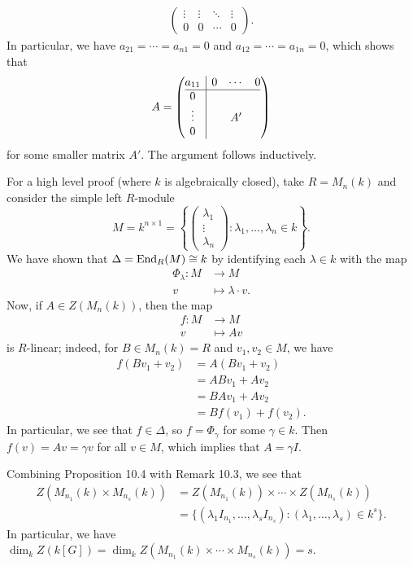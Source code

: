 \begin{pf}
\begin{align*}
\begin{pmatrix}
            \vdots & \vdots & \ddots & \vdots \\
            0 & 0 & \cdots & 0
        \end{pmatrix}. 
    \end{align*}
    In particular, we have $a_{21} = \cdots = a_{n1} = 0$ and 
    $a_{12} = \cdots = a_{1n} = 0$, which shows that 
    \[ A = \left(\begin{array}{@{}c|ccc@{}}
        a_{11} & 0 & \cdots & 0 \\\hline
        0 \\
        \vdots & & A' & \\
        0 
      \end{array}\right) \]
    for some smaller matrix $A'$. The argument follows inductively. 

    For a high level proof (where $k$ is algebraically closed), take 
    $R = M_n(k)$ and consider the simple left $R$-module
    \[ M = k^{n\times 1} = \left\{ \begin{pmatrix} \lambda_1 \\ \vdots \\ 
        \lambda_n \end{pmatrix} : \lambda_1, \dots, \lambda_n \in k \right\}. \] 
    We have shown that $\Delta = \operatorname{End}_R(M) \cong k$
    by identifying each $\lambda \in k$ with the map 
    \begin{align*}
        \Phi_\lambda : M &\to M \\ v &\mapsto \lambda \cdot v. 
    \end{align*} 
    Now, if $A \in Z(M_n(k))$, then the map 
    \begin{align*} f : M &\to M \\ v &\mapsto Av \end{align*}
    is $R$-linear; indeed, for $B \in M_n(k) = R$ and $v_1, v_2 \in M$, we have 
    \begin{align*} 
        f(Bv_1 + v_2) &= A(Bv_1 + v_2) \\ 
        &= ABv_1 + Av_2 \\
        &= BAv_1 + Av_2 \\ 
        &= Bf(v_1) + f(v_2).
    \end{align*}
    In particular, we see that $f \in \Delta$, so $f = \Phi_\gamma$ for some 
    $\gamma \in k$. Then $f(v) = Av = \gamma v$ for all $v \in M$, which 
    implies that $A = \gamma I$. 
\end{pf}

Combining Proposition 10.4 with Remark 10.3, we see that 
\begin{align*}
    Z(M_{n_1}(k) \times M_{n_s}(k)) 
    &= Z(M_{n_1}(k)) \times \cdots \times Z(M_{n_s}(k)) \\
    &= \{(\lambda_1 I_{n_1}, \dots, \lambda_s I_{n_s}) : 
    (\lambda_1, \dots, \lambda_s) \in k^s\}. 
\end{align*}
In particular, we have 
$\dim_k Z(k[G]) = \dim_k Z(M_{n_1}(k) \times \cdots \times M_{n_s}(k)) = s$.

